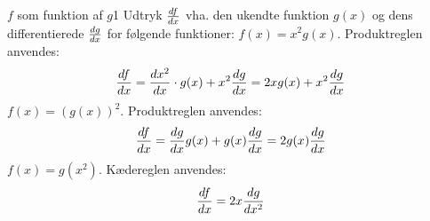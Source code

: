 \begin{opgave}{$f$ som funktion af $g$}{1}
Udtryk ${d{f} \over d{x}}$ vha. den ukendte funktion $g(x)$ og dens
differentierede ${d{g} \over d{x}}$ for følgende funktioner:
\opg $f(x) = x^2 g(x)$. Produktreglen anvendes:
\begin{equation*}
{d{f} \over d{x}} = {d{x^2} \over d{x}}\cdot g(x) + x^2{d{g} \over d{x}} = 2xg(x)+x^2 {d{g} \over d{x}}
\end{equation*}
\opg $f(x) = \left(g(x)\right)^2$. Produktreglen anvendes:
\begin{equation*}
{d{f} \over d{x}} = {d{g} \over d{x}} g(x) + g(x){d{g} \over d{x}} = 2g(x){d{g} \over d{x}}
\end{equation*}
\opg $f(x) = g(x^2)$. Kædereglen anvendes:
\begin{equation*}
{d{f} \over d{x}}=2x{d{g} \over d{x^2}}
\end{equation*}
\end{opgave}

